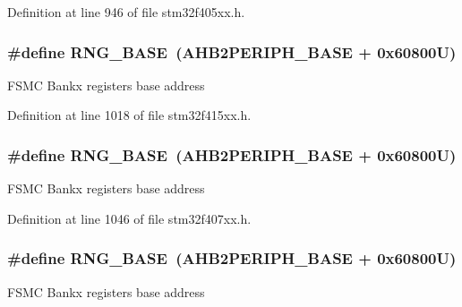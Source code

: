 Definition at line 946 of file stm32f405xx.\+h.

\subsubsection[{\texorpdfstring{R\+N\+G\+\_\+\+B\+A\+SE}{RNG_BASE}}]{\setlength{\rightskip}{0pt plus 5cm}\#define R\+N\+G\+\_\+\+B\+A\+SE~({\bf A\+H\+B2\+P\+E\+R\+I\+P\+H\+\_\+\+B\+A\+SE} + 0x60800\+U)}\hypertarget{group___peripheral__registers__structures_gab92662976cfe62457141e5b4f83d541c}{}\label{group___peripheral__registers__structures_gab92662976cfe62457141e5b4f83d541c}
F\+S\+MC Bankx registers base address 

Definition at line 1018 of file stm32f415xx.\+h.

\subsubsection[{\texorpdfstring{R\+N\+G\+\_\+\+B\+A\+SE}{RNG_BASE}}]{\setlength{\rightskip}{0pt plus 5cm}\#define R\+N\+G\+\_\+\+B\+A\+SE~({\bf A\+H\+B2\+P\+E\+R\+I\+P\+H\+\_\+\+B\+A\+SE} + 0x60800\+U)}\hypertarget{group___peripheral__registers__structures_gab92662976cfe62457141e5b4f83d541c}{}\label{group___peripheral__registers__structures_gab92662976cfe62457141e5b4f83d541c}
F\+S\+MC Bankx registers base address 

Definition at line 1046 of file stm32f407xx.\+h.

\subsubsection[{\texorpdfstring{R\+N\+G\+\_\+\+B\+A\+SE}{RNG_BASE}}]{\setlength{\rightskip}{0pt plus 5cm}\#define R\+N\+G\+\_\+\+B\+A\+SE~({\bf A\+H\+B2\+P\+E\+R\+I\+P\+H\+\_\+\+B\+A\+SE} + 0x60800\+U)}\hypertarget{group___peripheral__registers__structures_gab92662976cfe62457141e5b4f83d541c}{}\label{group___peripheral__registers__structures_gab92662976cfe62457141e5b4f83d541c}
F\+S\+MC Bankx registers base address 

